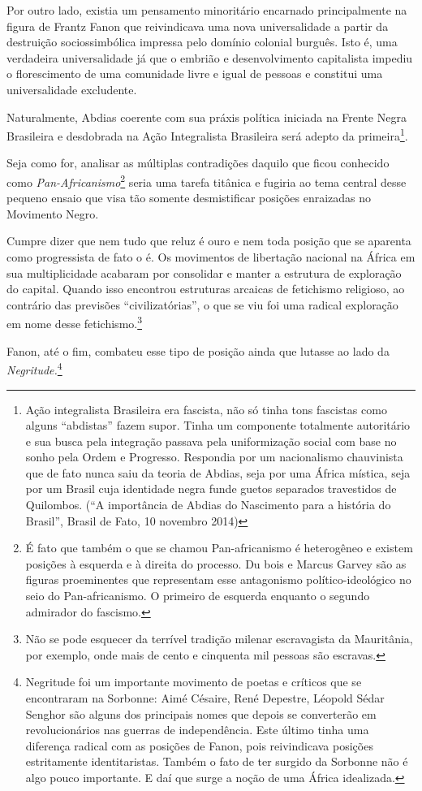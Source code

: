 Por outro lado, existia um pensamento minoritário encarnado
principalmente na figura de Frantz Fanon que reivindicava uma nova
universalidade a partir da destruição sociossimbólica impressa pelo
domínio colonial burguês. Isto é, uma verdadeira universalidade já que o
embrião e desenvolvimento capitalista impediu o florescimento de uma
comunidade livre e igual de pessoas e constitui uma universalidade
excludente.

Naturalmente, Abdias coerente com sua práxis política iniciada na Frente
Negra Brasileira e desdobrada na Ação Integralista Brasileira será
adepto da primeira\footnote{Ação integralista Brasileira era fascista,
  não só tinha tons fascistas como alguns ``abdistas'' fazem supor.
  Tinha um componente totalmente autoritário e sua busca pela integração
  passava pela uniformização social com base no sonho pela Ordem e
  Progresso. Respondia por um nacionalismo chauvinista que de fato nunca
  saiu da teoria de Abdias, seja por uma África mística, seja por um
  Brasil cuja identidade negra funde guetos separados travestidos de
  Quilombos. (``A importância de Abdias do Nascimento para a história do
  Brasil'', Brasil de Fato, 10 novembro 2014)}.

Seja como for, analisar as múltiplas contradições daquilo que ficou
conhecido como \emph{Pan-Africanismo}\footnote{É fato que também o que
  se chamou Pan-africanismo é heterogêneo e existem posições à esquerda
  e à direita do processo. Du bois e Marcus Garvey são as figuras
  proeminentes que representam esse antagonismo político-ideológico no
  seio do Pan-africanismo. O primeiro de esquerda enquanto o segundo
  admirador do fascismo.} seria uma tarefa titânica e fugiria ao tema
central desse pequeno ensaio que visa tão somente desmistificar posições
enraizadas no Movimento Negro.

Cumpre dizer que nem tudo que reluz é ouro e nem toda posição que se
aparenta como progressista de fato o é. Os movimentos de libertação
nacional na África em sua multiplicidade acabaram por consolidar e
manter a estrutura de exploração do capital. Quando isso encontrou
estruturas arcaicas de fetichismo religioso, ao contrário das previsões
``civilizatórias'', o que se viu foi uma radical exploração em nome
desse fetichismo.\footnote{Não se pode esquecer da terrível tradição
  milenar escravagista da Mauritânia, por exemplo, onde mais de cento e
  cinquenta mil pessoas são escravas.}

Fanon, até o fim, combateu esse tipo de posição ainda que lutasse ao
lado da \emph{Negritude.}\footnote{Negritude foi um importante movimento
  de poetas e críticos que se encontraram na Sorbonne: Aimé Césaire,
  René Depestre, Léopold Sédar Senghor são alguns dos principais nomes
  que depois se converterão em revolucionários nas guerras de
  independência. Este último tinha uma diferença radical com as posições
  de Fanon, pois reivindicava posições estritamente identitaristas.
  Também o fato de ter surgido da Sorbonne não é algo pouco importante.
  E daí que surge a noção de uma África idealizada.}

